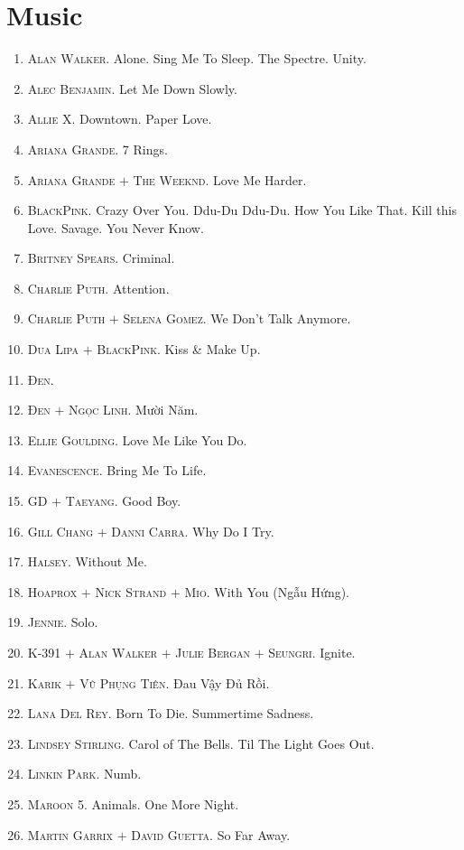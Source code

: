 \documentclass{article}
\begin{document}
\section{Music}
\begin{enumerate}
	\item \textsc{Alan Walker.} Alone. Sing Me To Sleep. The Spectre. Unity.
	\item \textsc{Alec Benjamin.} Let Me Down Slowly.
	\item \textsc{Allie X.} Downtown. Paper Love.
	\item \textsc{Ariana Grande.} 7 Rings.
	\item \textsc{Ariana Grande $+$ The Weeknd.} Love Me Harder.
	\item \textsc{BlackPink.} Crazy Over You. Ddu-Du Ddu-Du. How You Like That. Kill this Love. Savage. You Never Know.
	\item \textsc{Britney Spears.} Criminal.
	\item \textsc{Charlie Puth.} Attention.
	\item \textsc{Charlie Puth $+$ Selena Gomez.} We Don't Talk Anymore.
	\item \textsc{Dua Lipa $+$ BlackPink.} Kiss \& Make Up.
	\item \textsc{Đen.}
	\item \textsc{Đen $+$ Ngọc Linh.} Mười Năm.
	\item \textsc{Ellie Goulding.} Love Me Like You Do.
	\item \textsc{Evanescence.} Bring Me To Life.
	\item \textsc{GD $+$ Taeyang.} Good Boy.
	\item \textsc{Gill Chang $+$ Danni Carra.} Why Do I Try.
	\item \textsc{Halsey.} Without Me.
	\item \textsc{Hoaprox $+$ Nick Strand $+$ Mio.} With You (Ngẫu Hứng).
	\item \textsc{Jennie.} Solo.
	\item \textsc{K-391 $+$ Alan Walker $+$ Julie Bergan $+$ Seungri.} Ignite.
	\item \textsc{Karik $+$ Vũ Phụng Tiên.} Đau Vậy Đủ Rồi.
	\item \textsc{Lana Del Rey.} Born To Die. Summertime Sadness.
	\item \textsc{Lindsey Stirling.} Carol of The Bells. Til The Light Goes Out.
	\item \textsc{Linkin Park.} Numb.
	\item \textsc{Maroon 5.} Animals. One More Night.
	\item \textsc{Martin Garrix $+$ David Guetta.} So Far Away.

\end{enumerate}
\end{document}
